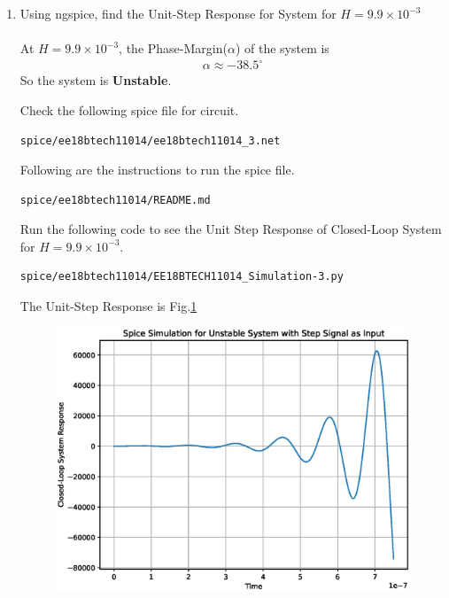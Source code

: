\begin{enumerate}[label=\thesection.\arabic*.,ref=\thesection.\theenumi]
\item Using ngspice, find the Unit-Step Response for System for $H=9.9\times 10^{-3}$\\
\solution\\
 At $H=9.9\times 10^{-3}$, the Phase-Margin($\alpha$) of the system is
\begin{align}
\alpha \approx -38.5^{\circ}
\end{align}
So the system is \textbf{Unstable}.

Check the following spice file for circuit.
\begin{lstlisting}
spice/ee18btech11014/ee18btech11014_3.net
\end{lstlisting}

Following are the instructions to run the spice file.
\begin{lstlisting}
spice/ee18btech11014/README.md
\end{lstlisting}

Run the following code to see the Unit Step Response of Closed-Loop System for $H=9.9\times 10^{-3}$.
\begin{lstlisting}
spice/ee18btech11014/EE18BTECH11014_Simulation-3.py
\end{lstlisting}

The Unit-Step Response is Fig.\ref{fig:Unstable System}
\begin{figure}[ht!]
	\begin{center}
		\includegraphics[width=\columnwidth]{./figs/ee18btech11014/ee18btech11014_Spice_Result.eps}
	\end{center}
	\caption{}
	\label{fig:Unstable System}
\end{figure}
\end{enumerate}
